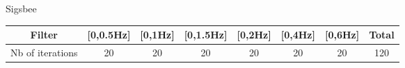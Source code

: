 \begin{frame}[noframenumbering]{Sigsbee}
\begin{multicols}{2}
   \end{multicols}

   \vspace{-1cm}
   \scriptsize
\begin{table}[H]
  \centering
\begin{tabular}{|c|c|c|c|c|c|c|c|}
\hline
Filter           & {[}0,0.5Hz{]} & {[}0,1Hz{]} & {[}0,1.5Hz{]} & {[}0,2Hz{]} & {[}0,4Hz{]} & {[}0,6Hz{]}   & Total \\ \hline
Nb of iterations & 20          & 20          & 20              & 20          & 20          & 20            &  120    \\ \hline
\end{tabular}
\end{table}
\end{frame}









